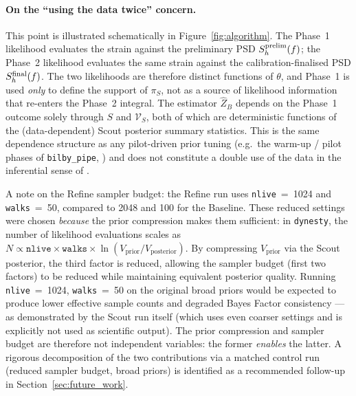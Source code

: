 \documentclass[12pt]{article}
\begin{document}
\paragraph{On the ``using the data twice'' concern.}
This point is illustrated schematically in Figure~\ref{fig:algorithm}. The Phase~1 likelihood evaluates the strain against the preliminary PSD $S_h^{\rm prelim}(f)$; the Phase~2 likelihood evaluates the same strain against the calibration-finalised PSD $S_h^{\rm final}(f)$. The two likelihoods are therefore distinct functions of $\theta$, and Phase~1 is used \emph{only} to define the support of $\pi_S$, not as a source of likelihood information that re-enters the Phase~2 integral. The estimator $\widehat{Z}_B$ depends on the Phase~1 outcome solely through $S$ and $\mathcal{V}_S$, both of which are deterministic functions of the (data-dependent) Scout posterior summary statistics. This is the same dependence structure as any pilot-driven prior tuning (e.g.\ the warm-up / pilot phases of \texttt{bilby\_pipe}, \cite{Smith2020}) and does not constitute a double use of the data in the inferential sense of \cite{Berger2006}.

A note on the Refine sampler budget: the Refine run uses \texttt{nlive}~=~1024 and \texttt{walks}~=~50, compared to 2048 and 100 for the Baseline. These reduced settings were chosen \emph{because} the prior compression makes them sufficient: in \texttt{dynesty}, the number of likelihood evaluations scales as $N \propto \texttt{nlive} \times \texttt{walks} \times \ln(V_{\text{prior}}/V_{\text{posterior}})$. By compressing $V_{\text{prior}}$ via the Scout posterior, the third factor is reduced, allowing the sampler budget (first two factors) to be reduced while maintaining equivalent posterior quality. Running \texttt{nlive}~=~1024, \texttt{walks}~=~50 on the original broad priors would be expected to produce lower effective sample counts and degraded Bayes Factor consistency — as demonstrated by the Scout run itself (which uses even coarser settings and is explicitly not used as scientific output). The prior compression and sampler budget are therefore not independent variables: the former \emph{enables} the latter. A rigorous decomposition of the two contributions via a matched control run (reduced sampler budget, broad priors) is identified as a recommended follow-up in Section~\ref{sec:future_work}.
\end{document}
